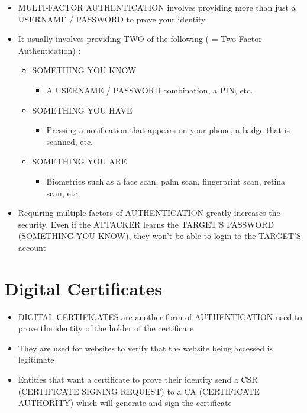 \begin{itemize}
\tightlist
\item
  MULTI-FACTOR AUTHENTICATION involves providing more than just a
  USERNAME / PASSWORD to prove your identity
\item
  It usually involves providing TWO of the following ( = Two-Factor
  Authentication) :

  \begin{itemize}
  \tightlist
  \item
    SOMETHING YOU KNOW

    \begin{itemize}
    \tightlist
    \item
      A USERNAME / PASSWORD combination, a PIN, etc.
    \end{itemize}
  \item
    SOMETHING YOU HAVE

    \begin{itemize}
    \tightlist
    \item
      Pressing a notification that appears on your phone, a badge that
      is scanned, etc.
    \end{itemize}
  \item
    SOMETHING YOU ARE

    \begin{itemize}
    \tightlist
    \item
      Biometrics such as a face scan, palm scan, fingerprint scan,
      retina scan, etc.
    \end{itemize}
  \end{itemize}
\item
  Requiring multiple factors of AUTHENTICATION greatly increases the
  security. Even if the ATTACKER learns the TARGET'S PASSWORD (SOMETHING
  YOU KNOW), they won't be able to login to the TARGET'S account
\end{itemize}

\section{Digital Certificates}\label{digital-certificates}

\begin{itemize}
\tightlist
\item
  DIGITAL CERTIFICATES are another form of AUTHENTICATION used to prove
  the identity of the holder of the certificate
\item
  They are used for websites to verify that the website being accessed
  is legitimate
\item
  Entities that want a certificate to prove their identity send a CSR
  (CERTIFICATE SIGNING REQUEST) to a CA (CERTIFICATE AUTHORITY) which
  will generate and sign the certificate
\end{itemize}

